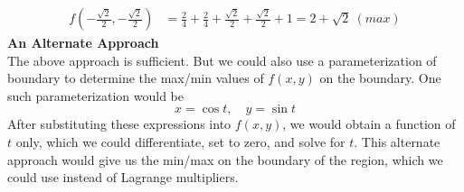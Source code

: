 {\begin{align*}
        f(-\frac{\sqrt2}{2},-\frac{\sqrt2}{2}) &= \frac24 + \frac24 + \frac{\sqrt2}{2}+\frac{\sqrt2}{2} + 1 = 2+\sqrt2 \ (max)
    \end{align*}
    \textbf{An Alternate Approach}\\
    The above approach is sufficient. But we could also use a parameterization of boundary to determine the max/min values of $f(x,y)$ on the boundary. One such parameterization would be $$x = \cos t, \quad y = \sin t$$
    After substituting these expressions into $f(x,y)$, we would obtain a function of $t$ only, which we could differentiate, set to zero, and solve for $t$. This alternate approach would give us the min/max on the boundary of the region, which we could use instead of Lagrange multipliers. 
    } 
   \else
      
   \fi
    
\fi




